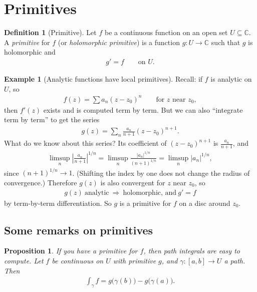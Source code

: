 \documentclass[11pt]{article}
\theoremstyle{plain}
\newtheorem{proposition}[theorem]{Proposition}
\theoremstyle{definition}
\newtheorem{definition}[theorem]{Definition}
\newtheorem{example}[theorem]{Example}
\theoremstyle{remark}
\numberwithin{equation}{section}
\newcommand{\be}{\begin{eqnarray}}
\newcommand{\ee}{\end{eqnarray}}
\newcommand{\C}{\mathbb{C}}
\begin{document}
\section{Primitives}
\begin{definition}[Primitive]
Let $f$ be a continuous function on an open set $U\subseteq\C$. A
\emph{primitive} for $f$ (or \emph{holomorphic primitive}) is a function
$g\colon U\to\C$ such that $g$ is holomorphic and
\be
 g'=f\qquad\text{on }U.
\ee
\end{definition}

\begin{example}[Analytic functions have local primitives]
\label{ex:local-prim}
Recall: if $f$ is analytic on $U$, so
\be
 f(z)=\sum a_n(z-z_0)^n\qquad\text{for $z$ near $z_0$},
\ee
then $f'(z)$ exists and is computed term by term. But we can also
``integrate term by term'' to get the series
\be
 g(z)=\sum_n\frac{a_n}{n+1}(z-z_0)^{n+1}.
\ee
What do we know about this series? Its coefficient of $(z-z_0)^{n+1}$ is
$\frac{a_n}{n+1}$, and
\be
 \limsup_n\left|\frac{a_n}{n+1}\right|^{1/n}
 =\limsup_n\frac{|a_n|^{1/n}}{(n+1)^{1/n}}
 =\limsup_n|a_n|^{1/n},
\ee
since $(n+1)^{1/n}\to1$. (Shifting the index by one does not change the
radius of convergence.) Therefore $g(z)$ is also convergent for $z$ near
$z_0$, so
\be
 g(z)\ \text{analytic}\ \Longrightarrow\ \text{holomorphic, and}\ g'=f
\ee
by term-by-term differentiation. So $g$ is a primitive for $f$ on a disc
around $z_0$.
\end{example}

\subsection*{Some remarks on primitives}
\begin{proposition}
\label{prop:prim-eval}
If you have a primitive for $f$, then path integrals are easy to compute. Let
$f$ be continuous on $U$ with primitive $g$, and $\gamma\colon[a,b]\to U$ a
path. Then
\be
 \int_\gamma f=g\bigl(\gamma(b)\bigr)-g\bigl(\gamma(a)\bigr).
\ee
\end{proposition}
\end{document}
